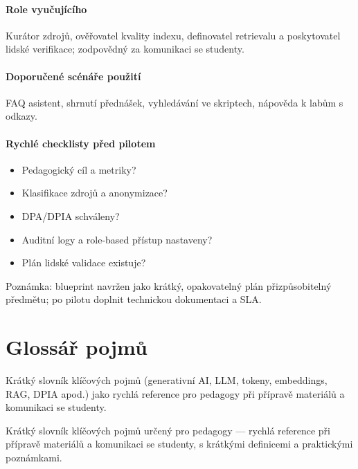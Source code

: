 \documentclass{report}%
\begin{document}
\paragraph{Role vyučujícího} Kurátor zdrojů, ověřovatel kvality indexu, definovatel retrievalu a poskytovatel lidské verifikace; zodpovědný za komunikaci se studenty.

\paragraph{Doporučené scénáře použití} FAQ asistent, shrnutí přednášek, vyhledávání ve skriptech, nápověda k labům s odkazy.

\paragraph{Rychlé checklisty před pilotem} \begin{itemize}
  \item Pedagogický cíl a metriky? \underline{\hspace{4cm}} \item Klasifikace zdrojů a anonymizace? \underline{\hspace{3cm}}
  \item DPA/DPIA schváleny? \underline{\hspace{3cm}} \item Auditní logy a role‑based přístup nastaveny? \underline{\hspace{3cm}}
  \item Plán lidské validace existuje? \underline{\hspace{3cm}}
\end{itemize}

\noindent Poznámka: blueprint navržen jako krátký, opakovatelný plán přizpůsobitelný předmětu; po pilotu doplnit technickou dokumentaci a SLA.%

%
\section{Glossář pojmů}%
Krátký slovník klíčových pojmů (generativní AI, LLM, tokeny, embeddings, RAG, DPIA apod.) jako rychlá reference pro pedagogy při přípravě materiálů a komunikaci se studenty.%


%
Krátký slovník klíčových pojmů určený pro pedagogy — rychlá reference při přípravě materiálů a komunikaci se studenty, s krátkými definicemi a praktickými poznámkami.
\end{document}
